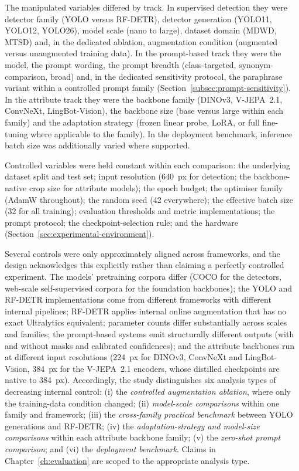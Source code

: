 The manipulated variables differed by track. In supervised detection they were detector family (YOLO versus RF-DETR), detector generation (YOLO11, YOLO12, YOLO26), model scale (nano to large), dataset domain (MDWD, MTSD) and, in the dedicated ablation, augmentation condition (augmented versus unaugmented training data). In the prompt-based track they were the model, the prompt wording, the prompt breadth (class-targeted, synonym-comparison, broad) and, in the dedicated sensitivity protocol, the paraphrase variant within a controlled prompt family (Section~\ref{subsec:prompt-sensitivity}). In the attribute track they were the backbone family (DINOv3, V-JEPA~2.1, ConvNeXt, LingBot-Vision), the backbone size (base versus large within each family) and the adaptation strategy (frozen linear probe, LoRA, or full fine-tuning where applicable to the family). In the deployment benchmark, inference batch size was additionally varied where supported.

Controlled variables were held constant within each comparison: the underlying dataset split and test set; input resolution (640~px for detection; the backbone-native crop size for attribute models); the epoch budget; the optimiser family (AdamW throughout); the random seed (42 everywhere); the effective batch size (32 for all training); evaluation thresholds and metric implementations; the prompt protocol; the checkpoint-selection rule; and the hardware (Section~\ref{sec:experimental-environment}).

Several controls were only approximately aligned across frameworks, and the design acknowledges this explicitly rather than claiming a perfectly controlled experiment. The models' pretraining corpora differ (COCO for the detectors, web-scale self-supervised corpora for the foundation backbones); the YOLO and RF-DETR implementations come from different frameworks with different internal pipelines; RF-DETR applies internal online augmentation that has no exact Ultralytics equivalent; parameter counts differ substantially across scales and families; the prompt-based systems emit structurally different outputs (with and without masks and calibrated confidences); and the attribute backbones run at different input resolutions (224~px for DINOv3, ConvNeXt and LingBot-Vision, 384~px for the V-JEPA~2.1 encoders, whose distilled checkpoints are native to 384~px). Accordingly, the study distinguishes six analysis types of decreasing internal control: (i) the \emph{controlled augmentation ablation}, where only the training-data condition changed; (ii) \emph{model-scale comparisons} within one family and framework; (iii) the \emph{cross-family practical benchmark} between YOLO generations and RF-DETR; (iv) the \emph{adaptation-strategy and model-size comparisons} within each attribute backbone family; (v) the \emph{zero-shot prompt comparison}; and (vi) the \emph{deployment benchmark}. Claims in Chapter~\ref{ch:evaluation} are scoped to the appropriate analysis type.

